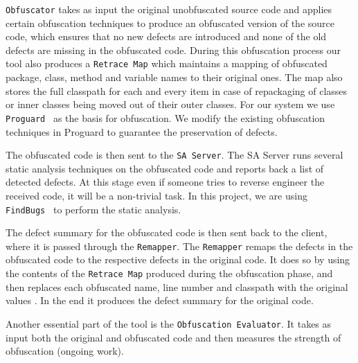 \documentclass[conference]{IEEEtran}
\begin{document}
{\tt Obfuscator} takes as input the original unobfuscated source code and applies certain obfuscation techniques to produce an obfuscated version of the source code, which 
ensures that no new defects are introduced and none of the old defects are missing in the obfuscated code. During this obfuscation process our tool also produces a {\tt Retrace Map} which maintains a 
mapping of obfuscated package, class, method and variable names to their original ones. The map also stores the full classpath for each and every item in case of repackaging of classes 
or inner classes being moved out of their outer classes. For our system we use {\tt Proguard}~\cite{proguard} as the basis for obfuscation. We modify the existing obfuscation 
techniques in Proguard to guarantee the preservation of defects.

The obfuscated code is then sent to the {\tt SA Server}. The SA Server runs several static analysis techniques on the obfuscated code and reports back a 
list of detected defects. At this stage even if someone tries to reverse engineer the received code, it will be a non-trivial task. In this project, 
we are using {\tt FindBugs}~\cite{findbugs} to perform the static analysis.

The defect summary for the obfuscated code is then sent back to the client, where it is passed through the {\tt Remapper}. The {\tt Remapper} remaps the defects in the obfuscated code to 
the respective defects in the original code. It does so by using the contents of the {\tt Retrace Map} produced during the obfuscation phase, and then replaces each obfuscated name, line number 
and classpath with the original values . In the end it produces the defect summary for the original code.

Another essential part of the tool is the {\tt Obfuscation Evaluator}. It takes as input both the original and obfuscated code and then measures the strength of obfuscation (ongoing work).
\end{document}
